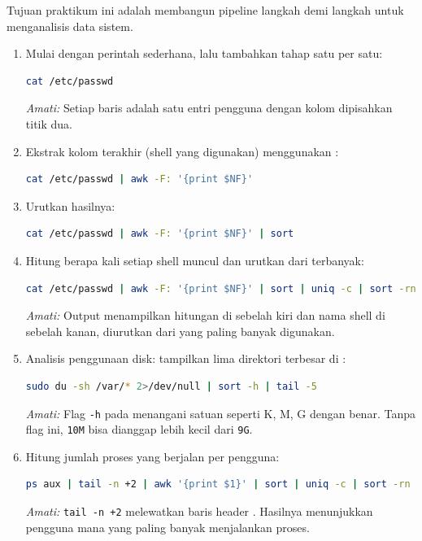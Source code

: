 Tujuan praktikum ini adalah membangun pipeline langkah demi langkah untuk menganalisis data sistem.

\begin{enumerate}
    \item Mulai dengan perintah sederhana, lalu tambahkan tahap satu per satu:
\begin{lstlisting}[language=bash, caption={Pipeline bertahap: hitung pengguna per shell}]
cat /etc/passwd
\end{lstlisting}
    \textit{Amati:} Setiap baris adalah satu entri pengguna dengan kolom dipisahkan titik dua.

    \item Ekstrak kolom terakhir (shell yang digunakan) menggunakan :
\begin{lstlisting}[language=bash, caption={Ekstrak kolom shell dari /etc/passwd}]
cat /etc/passwd | awk -F: '{print $NF}'
\end{lstlisting}

    \item Urutkan hasilnya:
\begin{lstlisting}[language=bash, caption={Urutkan daftar shell}]
cat /etc/passwd | awk -F: '{print $NF}' | sort
\end{lstlisting}

    \item Hitung berapa kali setiap shell muncul dan urutkan dari terbanyak:
\begin{lstlisting}[language=bash, caption={Hitung kemunculan setiap shell}]
cat /etc/passwd | awk -F: '{print $NF}' | sort | uniq -c | sort -rn
\end{lstlisting}
    \textit{Amati:} Output menampilkan hitungan di sebelah kiri dan nama shell di sebelah kanan, diurutkan dari yang paling banyak digunakan.

    \item Analisis penggunaan disk: tampilkan lima direktori terbesar di :
\begin{lstlisting}[language=bash, caption={Lima direktori terbesar di /var}]
sudo du -sh /var/* 2>/dev/null | sort -h | tail -5
\end{lstlisting}
    \textit{Amati:} Flag \texttt{-h} pada  menangani satuan seperti K, M, G dengan benar. Tanpa flag ini, \texttt{10M} bisa dianggap lebih kecil dari \texttt{9G}.

    \item Hitung jumlah proses yang berjalan per pengguna:
\begin{lstlisting}[language=bash, caption={Jumlah proses per pengguna}]
ps aux | tail -n +2 | awk '{print $1}' | sort | uniq -c | sort -rn
\end{lstlisting}
    \textit{Amati:} \texttt{tail -n +2} melewatkan baris header . Hasilnya menunjukkan pengguna mana yang paling banyak menjalankan proses.
\end{enumerate}

